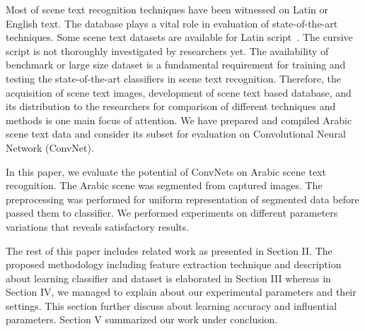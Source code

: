 \documentclass[conference]{IEEEtran}
\begin{document}
Most of scene text recognition techniques have been witnessed on Latin or English text. 
The  database plays a vital role in evaluation of state-of-the-art techniques. 
Some scene text datasets are available for Latin script~\cite{it,tm}. 
The cursive script is not thoroughly investigated by researchers yet. 
The availability of benchmark or large size dataset is a fundamental requirement for training and testing the state-of-the-art classifiers in scene text recognition. 
Therefore, the acquisition of scene text images, development of scene text based database, and its distribution to the researchers for comparison of different techniques and methods is one main focus of attention.
We have prepared and compiled  Arabic scene text data and consider its subset for evaluation on Convolutional Neural Network (ConvNet).

In this paper, we evaluate the potential of ConvNets on Arabic scene text recognition.
The Arabic scene was segmented from captured images.
The preprocessing was performed for uniform representation of segmented data before passed them to classifier.
We performed experiments on different parameters variations that reveals satisfactory results.

The rest of this paper includes related work as presented in Section II.
The proposed methodology including feature extraction technique and description about learning classifier and dataset is elaborated in Section III whereas in Section IV, we managed to explain about our experimental parameters and their settings.
This section further discuss about learning accuracy and influential parameters.
Section V summarized our work under conclusion.
\end{document}
